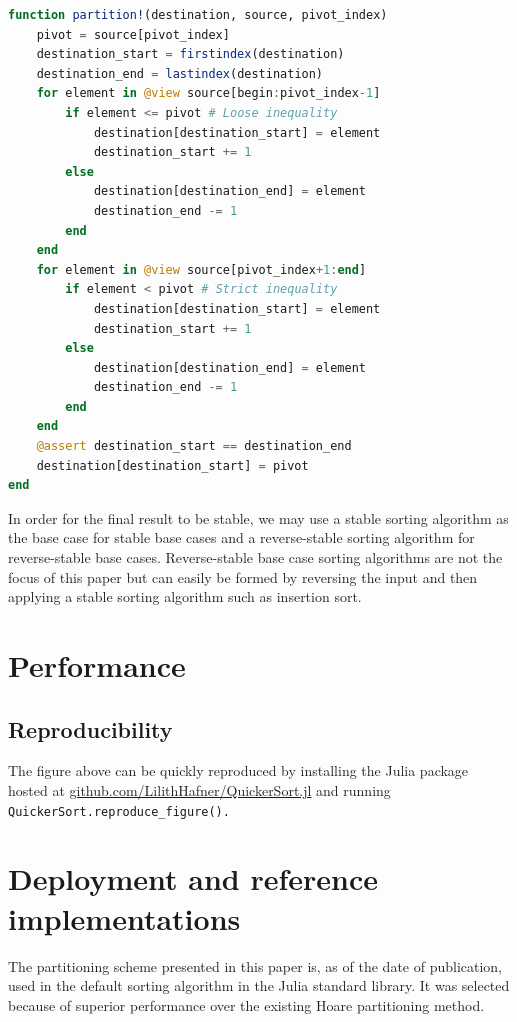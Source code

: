 \documentclass{juliacon}
\begin{document}
\begin{lstlisting}[language=Julia]
function partition!(destination, source, pivot_index)
    pivot = source[pivot_index]
    destination_start = firstindex(destination)
    destination_end = lastindex(destination)
    for element in @view source[begin:pivot_index-1]
        if element <= pivot # Loose inequality
            destination[destination_start] = element
            destination_start += 1
        else
            destination[destination_end] = element
            destination_end -= 1
        end
    end
    for element in @view source[pivot_index+1:end]
        if element < pivot # Strict inequality
            destination[destination_start] = element
            destination_start += 1
        else
            destination[destination_end] = element
            destination_end -= 1
        end
    end
    @assert destination_start == destination_end
    destination[destination_start] = pivot
end
\end{lstlisting}

In order for the final result to be stable, we may use a stable sorting algorithm as the base case for stable base cases and a reverse-stable sorting algorithm for reverse-stable base cases. Reverse-stable base case sorting algorithms are not the focus of this paper but can easily be formed by reversing the input and then applying a stable sorting algorithm such as insertion sort.

\section{Performance}

\scalebox{.5}{}

\subsection{Reproducibility}

The figure above can be quickly reproduced by installing the Julia package hosted at \href{https://github.com/LilithHafner/QuickerSort.jl}{github.com/LilithHafner/QuickerSort.jl} and running \lstinline{QuickerSort.reproduce_figure().}

\section{Deployment and reference implementations}

The partitioning scheme presented in this paper is, as of the date of publication, used in the default sorting algorithm in the Julia standard library. It was selected because of superior performance over the existing Hoare partitioning method\cite{PR}.
\end{document}
